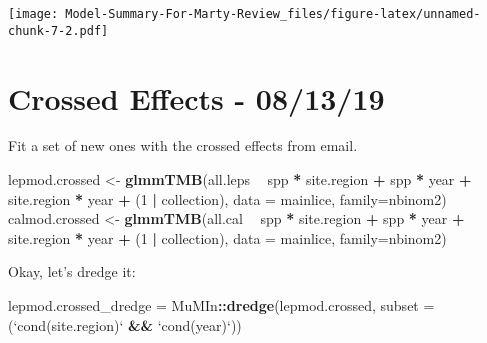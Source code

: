 \documentclass[]{article}
\newenvironment{Shaded}{\begin{snugshade}}{\end{snugshade}}
\newcommand{\KeywordTok}[1]{\textcolor[rgb]{0.13,0.29,0.53}{\textbf{#1}}}
\newcommand{\DataTypeTok}[1]{\textcolor[rgb]{0.13,0.29,0.53}{#1}}
\newcommand{\DecValTok}[1]{\textcolor[rgb]{0.00,0.00,0.81}{#1}}
\newcommand{\StringTok}[1]{\textcolor[rgb]{0.31,0.60,0.02}{#1}}
\newcommand{\OperatorTok}[1]{\textcolor[rgb]{0.81,0.36,0.00}{\textbf{#1}}}
\newcommand{\NormalTok}[1]{#1}
\begin{document}
\texttt{[image: Model-Summary-For-Marty-Review\_files/figure-latex/unnamed-chunk-7-2.pdf]}

\section{Crossed Effects - 08/13/19}\label{crossed-effects---081319}

Fit a set of new ones with the crossed effects from email.

\begin{Shaded}
\begin{Highlighting}[]
\NormalTok{lepmod.crossed <-}\StringTok{ }\KeywordTok{glmmTMB}\NormalTok{(all.leps }\OperatorTok{~}\StringTok{ }\NormalTok{spp }\OperatorTok{*}\StringTok{ }\NormalTok{site.region }\OperatorTok{+}\StringTok{ }\NormalTok{spp }\OperatorTok{*}\StringTok{ }\NormalTok{year }\OperatorTok{+}\StringTok{ }
\StringTok{                            }\NormalTok{site.region }\OperatorTok{*}\StringTok{ }\NormalTok{year }\OperatorTok{+}\StringTok{ }\NormalTok{(}\DecValTok{1} \OperatorTok{|}\StringTok{ }\NormalTok{collection), }
                          \DataTypeTok{data =}\NormalTok{ mainlice, }\DataTypeTok{family=}\NormalTok{nbinom2)}
\NormalTok{calmod.crossed <-}\StringTok{ }\KeywordTok{glmmTMB}\NormalTok{(all.cal }\OperatorTok{~}\StringTok{ }\NormalTok{spp }\OperatorTok{*}\StringTok{ }\NormalTok{site.region }\OperatorTok{+}\StringTok{ }\NormalTok{spp }\OperatorTok{*}\StringTok{ }\NormalTok{year }\OperatorTok{+}\StringTok{ }
\StringTok{                            }\NormalTok{site.region }\OperatorTok{*}\StringTok{ }\NormalTok{year }\OperatorTok{+}\StringTok{ }\NormalTok{(}\DecValTok{1} \OperatorTok{|}\StringTok{ }\NormalTok{collection), }
                          \DataTypeTok{data =}\NormalTok{ mainlice, }\DataTypeTok{family=}\NormalTok{nbinom2)}
\end{Highlighting}
\end{Shaded}

Okay, let's dredge it:

\begin{Shaded}
\begin{Highlighting}[]
\NormalTok{lepmod.crossed_dredge =}\StringTok{ }\NormalTok{MuMIn}\OperatorTok{::}\KeywordTok{dredge}\NormalTok{(lepmod.crossed, }\DataTypeTok{subset =}\NormalTok{ (}\StringTok{`}\DataTypeTok{cond(site.region)}\StringTok{`} \OperatorTok{&&}\StringTok{ `}\DataTypeTok{cond(year)}\StringTok{`}\NormalTok{))}
\end{Highlighting}
\end{Shaded}
\end{document}
